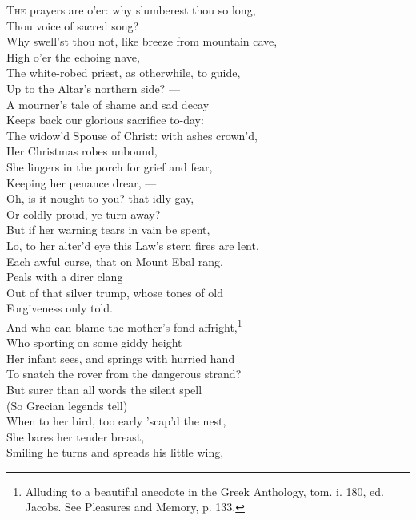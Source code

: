 
\textsc{The} prayers are o’er: why slumberest thou so long, \\
 Thou voice of sacred song? \\
 Why swell’st thou not, like breeze from mountain cave, \\
 High o’er the echoing nave, \\
 The white-robed priest, as otherwhile, to guide, \\
 Up to the Altar’s northern side? — \\
 A mourner’s tale of shame and sad decay \\
 Keeps back our glorious sacrifice to-day: \\
  The widow’d Spouse of Christ: with ashes crown’d, \\
 Her Christmas robes unbound, \\
 She lingers in the porch for grief and fear, \\
 Keeping her penance drear, — \\
 Oh, is it nought to you? that idly gay, \\
 Or coldly proud, ye turn away? \\
 But if her warning tears in vain be spent, \\
 Lo, to her alter’d eye this Law’s stern fires are lent. \\
  Each awful curse, that on Mount Ebal rang, \\
 Peals with a direr clang \\
 Out of that silver trump, whose tones of old \\
 Forgiveness only told. \\
 And who can blame the mother’s fond affright,\footnote{Alluding to a beautiful anecdote in the Greek Anthology, tom. i. 180, ed. Jacobs. See Pleasures and Memory, p. 133.} \\
 Who sporting on some giddy height \\
 Her infant sees, and springs with hurried hand \\
 To snatch the rover from the dangerous strand? \\
  But surer than all words the silent spell \\
 (So Grecian legends tell) \\
 When to her bird, too early ’scap’d the nest, \\
 She bares her tender breast, \\
 Smiling he turns and spreads his little wing, \\
